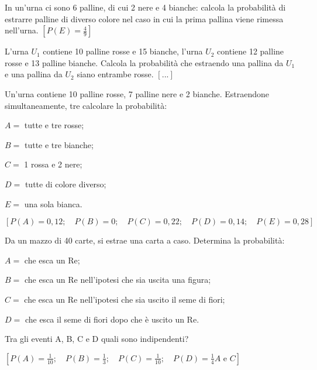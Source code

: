 \begin{esercizio}[\Ast]
 \label{ese:9.58}
In un'urna ci sono 6 palline, di cui 2 nere e 4 bianche: calcola la probabilità 
di estrarre palline di diverso colore nel caso in cui la prima pallina viene 
rimessa nell'urna.
\hfill $\left[P(E)=\frac 4 9\right]$
\end{esercizio}

\begin{esercizio}
 \label{ese:9.59}
L'urna $ U_1 $ contiene 10 palline rosse e 15 bianche, l'urna $ U_2 $ contiene 
12 palline rosse e 13 palline bianche. Calcola la probabilità che estraendo una 
pallina da $ U_1 $ e una pallina da $ U_2 $ siano entrambe rosse.
\hfill $\left[...\right]$
\end{esercizio}

\begin{esercizio}[\Ast]
 \label{ese:9.60}
 Un'urna contiene 10 palline rosse, 7 palline nere e 2 bianche. Estraendone 
simultaneamente, tre calcolare la probabilità:
\begin{itemize*}
 \item $ A= $ tutte e tre rosse;
 \item $ B= $ tutte e tre bianche;
 \item $ C= $ 1 rossa e 2 nere;
 \item $ D= $ tutte di colore diverso;
 \item $ E= $ una sola bianca.
\end{itemize*}
\hfill $\left[P(A)=0,12; \quad P(B)=0; \quad P(C)=0,22; \quad P(D)=0,14; \quad 
P(E)=0,28\right]$
\end{esercizio}

\begin{esercizio}[\Ast]
 \label{ese:9.61}
 Da un mazzo di 40 carte, si estrae una carta a caso. Determina la probabilità:
\begin{itemize*}
\item $ A= $ che esca un Re;
\item $ B= $ che esca un Re nell'ipotesi che sia uscita una figura;
\item $ C= $ che esca un Re nell'ipotesi che sia uscito il seme di fiori;
\item $ D= $ che esca il seme di fiori dopo che è uscito un Re.
\end{itemize*}
Tra gli eventi A, B, C e D quali sono indipendenti?

\hfill $\left[P(A)=\frac 1{10} ; \quad  P(B)=\frac 1 3 ; \quad  P(C)=\frac 
1{10} ; \quad  P(D)=\frac 1 4 A \text{ e } C\right]$
\end{esercizio}

